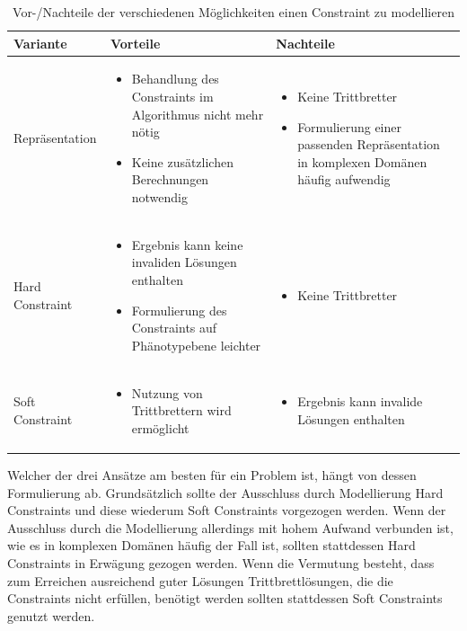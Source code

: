 \begin{table}[h]
	\begin{tabularx}{.9\textwidth}{lXX}\hline
		Variante 		& Vorteile 		& Nachteile \\ \hline
		Repräsentation 	& 
		\begin{itemize}
			\item Behandlung des Constraints im Algorithmus nicht mehr nötig
			\item Keine zusätzlichen Berechnungen notwendig
		\end{itemize} &
		\begin{itemize}
			\item Keine Trittbretter
			\item Formulierung einer passenden Repräsentation in komplexen Domänen häufig aufwendig
		\end{itemize} \\
		Hard Constraint &
		\begin{itemize}
			\item Ergebnis kann keine invaliden Lösungen enthalten
			\item Formulierung des Constraints auf Phänotypebene leichter
		\end{itemize} &
		\begin{itemize}
			\item Keine Trittbretter
		\end{itemize} \\
		Soft Constraint &
		\begin{itemize}
			\item Nutzung von Trittbrettern wird ermöglicht
		\end{itemize} &
		\begin{itemize}
			\item Ergebnis kann invalide Lösungen enthalten
		\end{itemize} \\
	\end{tabularx}
	\caption{Vor-/Nachteile der verschiedenen Möglichkeiten einen Constraint zu modellieren}
	\label{tab:methods_constraint}
\end{table}
	


Welcher der drei Ansätze am besten für ein Problem ist, hängt von dessen Formulierung ab.
Grundsätzlich sollte der Ausschluss durch Modellierung Hard Constraints und diese wiederum Soft Constraints vorgezogen werden.
Wenn der Ausschluss durch die Modellierung allerdings mit hohem Aufwand verbunden ist, wie es in komplexen Domänen häufig der Fall ist, sollten stattdessen Hard Constraints in Erwägung gezogen werden.
Wenn die Vermutung besteht, dass zum Erreichen ausreichend guter Lösungen Trittbrettlösungen, die die Constraints nicht erfüllen, benötigt werden sollten stattdessen Soft Constraints genutzt werden.

